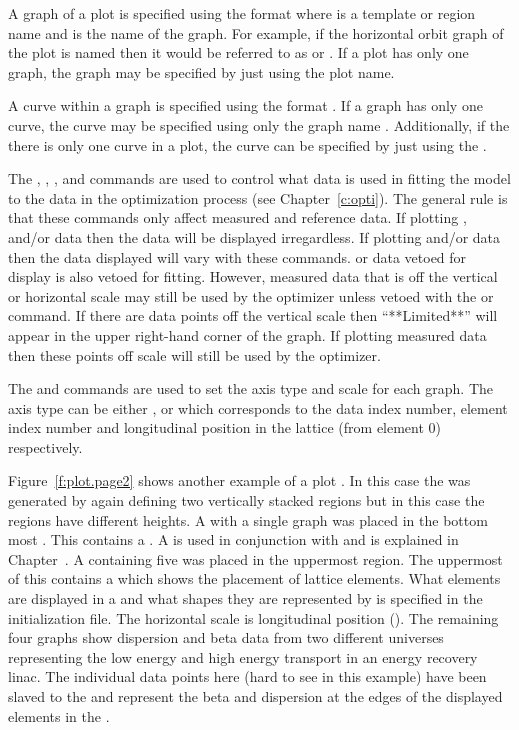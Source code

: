 A graph of a plot is specified using the format  where
 is a template or region name and  is the name of the
graph. For example, if the horizontal orbit graph of the  plot is named 
then it would be referred to as  or . If a plot has only one graph,
the graph may be specified by just using the plot name.

A curve within a graph is specified using the format
. If a graph has only one curve, the curve may be
specified using only the graph name . Additionally, if the there
is only one curve in a plot, the curve can be specified by just using the .

The , , , and  commands are used to control what
data is used in fitting the model to the data in the optimization process (see
Chapter~\ref{c:opti}). The general rule is that these commands only affect measured and
reference data. If plotting ,  and/or  data then the data
will be displayed irregardless. If plotting  and/or  data then the data
displayed will vary with these commands.   or  data vetoed for display is
also vetoed for fitting.  However, measured data that is off the vertical or horizontal
scale may still be used by the optimizer unless vetoed with the  or 
command.  If there are data points off the vertical scale then ``**Limited**'' will appear
in the upper right-hand corner of the graph. If plotting measured data then these points
off scale will still be used by the optimizer.

The  and  commands are used to set the axis type and scale for each
graph. The axis type can be either ,  or  which corresponds
to the data index number, element index number and longitudinal position in the lattice
(from element 0) respectively.

Figure~\ref{f:plot.page2} shows another example of a plot .  In this case the
 was generated by again defining two vertically stacked regions but in this case
the regions have different heights.  A  with a single graph was placed
in the bottom most .  This  contains a .  A
 is used in conjunction with  and is explained in
Chapter~. A  containing five  was placed in
the uppermost region. The uppermost  of this  contains a
 which shows the placement of lattice elements.  What elements are
displayed in a  and what shapes they are represented by is specified in the
initialization file. The horizontal scale is longitudinal position ().  The
remaining four graphs show dispersion and beta data from two different universes
representing the low energy and high energy transport in an energy recovery linac. The
individual data points here (hard to see in this example) have been slaved to the
 and represent the beta and dispersion at the edges of the displayed
elements in the .


